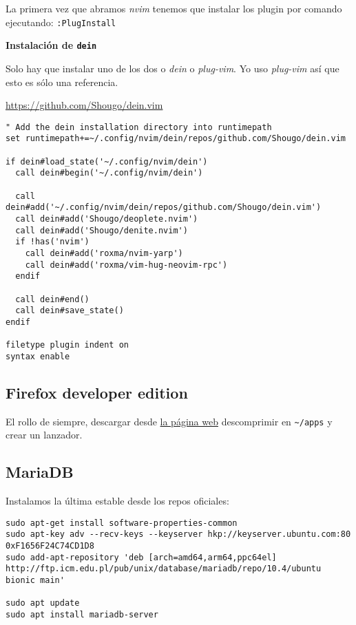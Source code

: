 \documentclass[
  12pt,
  spanish,
]{article}
\begin{document}
La primera vez que abramos \emph{nvim} tenemos que instalar los plugin
por comando ejecutando: \texttt{:PlugInstall}

\textbf{Instalación de \texttt{dein}}

Solo hay que instalar uno de los dos o \emph{dein} o \emph{plug-vim}. Yo
uso \emph{plug-vim} así que esto es sólo una referencia.

\url{https://github.com/Shougo/dein.vim}

\begin{verbatim}
" Add the dein installation directory into runtimepath
set runtimepath+=~/.config/nvim/dein/repos/github.com/Shougo/dein.vim

if dein#load_state('~/.config/nvim/dein')
  call dein#begin('~/.config/nvim/dein')

  call dein#add('~/.config/nvim/dein/repos/github.com/Shougo/dein.vim')
  call dein#add('Shougo/deoplete.nvim')
  call dein#add('Shougo/denite.nvim')
  if !has('nvim')
    call dein#add('roxma/nvim-yarp')
    call dein#add('roxma/vim-hug-neovim-rpc')
  endif

  call dein#end()
  call dein#save_state()
endif

filetype plugin indent on
syntax enable
\end{verbatim}

\hypertarget{firefox-developer-edition}{%
\subsection{Firefox developer edition}\label{firefox-developer-edition}}

El rollo de siempre, descargar desde
\href{https://www.mozilla.org/en-US/firefox/developer/}{la página web}
descomprimir en \texttt{\textasciitilde{}/apps} y crear un lanzador.

\hypertarget{mariadb}{%
\subsection{MariaDB}\label{mariadb}}

Instalamos la última estable desde los repos oficiales:

\begin{verbatim}
sudo apt-get install software-properties-common
sudo apt-key adv --recv-keys --keyserver hkp://keyserver.ubuntu.com:80 0xF1656F24C74CD1D8
sudo add-apt-repository 'deb [arch=amd64,arm64,ppc64el] http://ftp.icm.edu.pl/pub/unix/database/mariadb/repo/10.4/ubuntu bionic main'

sudo apt update
sudo apt install mariadb-server
\end{verbatim}
\end{document}
